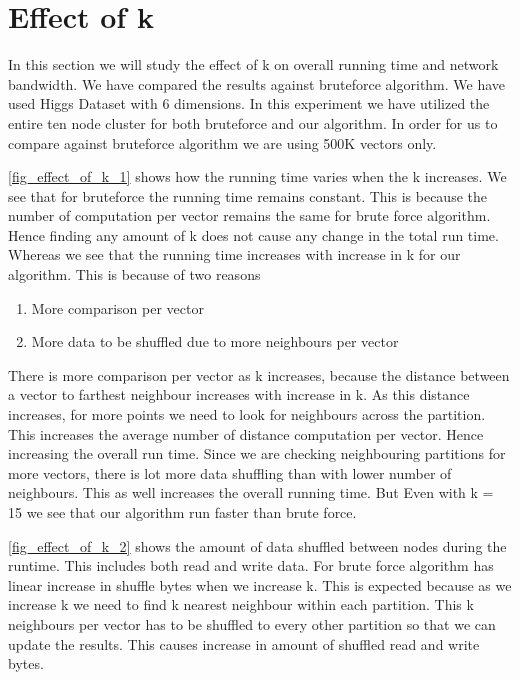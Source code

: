 \section{Effect of k}

In this section we will study the effect of k on overall running
time and network bandwidth. We have compared the results against bruteforce algorithm.
We have used Higgs Dataset with 6 dimensions. In this experiment we
have utilized the entire ten node cluster for both bruteforce and our
algorithm. In order for us to compare against bruteforce algorithm we are using
500K vectors only.

\cref{fig_effect_of_k_1} shows how
the running time varies when the k increases. We see that for
bruteforce the running time remains constant. This is because the
number of computation per vector remains the same for brute force
algorithm. Hence finding any amount of k does not
cause any change in the total run time. Whereas we see that the
running time increases with increase in k for our algorithm. This is
because of two reasons
\begin{enumerate}
\item More comparison per vector
\item More data to be shuffled due to more neighbours per vector
\end{enumerate}

There is more comparison per vector as k increases, because the distance between a vector to
farthest neighbour increases with increase in k. As this distance increases, for more
points we need to look for neighbours across the partition. This
increases the average number of distance computation per vector. Hence
increasing the overall run time. Since we are checking neighbouring
partitions for more vectors, there is lot more data shuffling than
with lower number of neighbours. This as well increases the overall
running time. But Even with k = 15 we see that our
algorithm run faster than brute force.

\cref{fig_effect_of_k_2} shows the amount of data
shuffled between nodes during the runtime. This includes both read and
write data. For brute force algorithm has
linear increase in shuffle bytes when we increase k. This is expected
because as we increase k we need to find k nearest neighbour within
each partition. This k neighbours per vector has to be shuffled to every
other partition so that we can update the results. This causes
increase in amount of shuffled read and write bytes.

